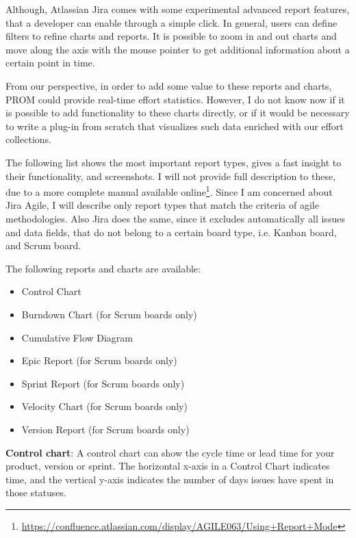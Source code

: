 Although, Atlassian Jira comes with some experimental advanced report features, that a developer can enable through a simple click. In general, users can define filters to refine charts and reports. It is possible to zoom in and out charts and move along the axis with the mouse pointer to get additional information about a certain point in time.

From our perspective, in order to add some value to these reports and charts, PROM could provide real-time effort statistics. However, I do not know now if it is possible to add functionality to these charts directly, or if it would be necessary to write a plug-in from scratch that visualizes such data enriched with our effort collections.

The following list shows the most important report types, gives a fast insight to their functionality, and screenshots. I will not provide full description to these, due to a more complete manual available online\footnote{\label{fn:report_modes}\url{https://confluence.atlassian.com/display/AGILE063/Using+Report+Mode}}. Since I am concerned about Jira Agile, I will describe only report types that match the criteria of agile methodologies. Also Jira does the same, since it excludes automatically all issues and data fields, that do not belong to a certain board type, i.e. Kanban board, and Scrum board.

The following reports and charts are available:

\begin{itemize}
	\item Control Chart
	\item Burndown Chart (for Scrum boards only)
	\item Cumulative Flow Diagram
	\item Epic Report (for Scrum boards only)
	\item Sprint Report (for Scrum boards only)
	\item Velocity Chart (for Scrum boards only)
	\item Version Report (for Scrum boards only)
\end{itemize}

\textbf{Control chart}: A control chart can show the cycle time or lead time for your product, version or sprint. The horizontal x-axis in a Control Chart indicates time, and the vertical y-axis indicates the number of days issues have spent in those statuses.

